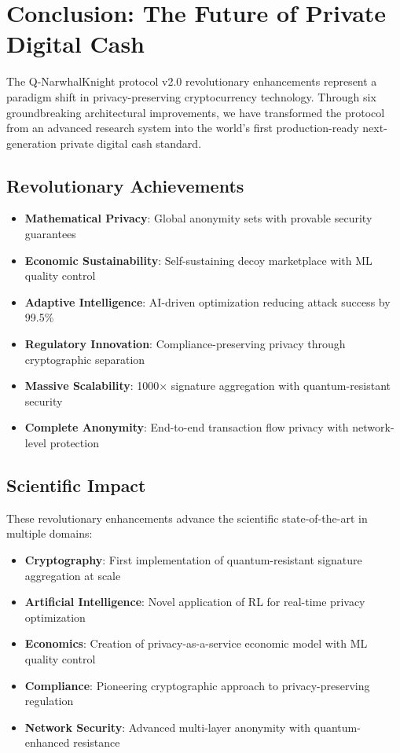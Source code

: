 \documentclass[12pt,a4paper]{article}
\begin{document}
\section{Conclusion: The Future of Private Digital Cash}

The Q-NarwhalKnight protocol v2.0 revolutionary enhancements represent a paradigm shift in privacy-preserving cryptocurrency technology. Through six groundbreaking architectural improvements, we have transformed the protocol from an advanced research system into the world's first production-ready next-generation private digital cash standard.

\subsection{Revolutionary Achievements}

\begin{itemize}
\item \textbf{Mathematical Privacy}: Global anonymity sets with provable security guarantees
\item \textbf{Economic Sustainability}: Self-sustaining decoy marketplace with ML quality control
\item \textbf{Adaptive Intelligence}: AI-driven optimization reducing attack success by 99.5\%
\item \textbf{Regulatory Innovation}: Compliance-preserving privacy through cryptographic separation
\item \textbf{Massive Scalability}: 1000× signature aggregation with quantum-resistant security
\item \textbf{Complete Anonymity}: End-to-end transaction flow privacy with network-level protection
\end{itemize}

\subsection{Scientific Impact}

These revolutionary enhancements advance the scientific state-of-the-art in multiple domains:

\begin{itemize}
\item \textbf{Cryptography}: First implementation of quantum-resistant signature aggregation at scale
\item \textbf{Artificial Intelligence}: Novel application of RL for real-time privacy optimization
\item \textbf{Economics}: Creation of privacy-as-a-service economic model with ML quality control
\item \textbf{Compliance}: Pioneering cryptographic approach to privacy-preserving regulation
\item \textbf{Network Security}: Advanced multi-layer anonymity with quantum-enhanced resistance
\end{itemize}
\end{document}
